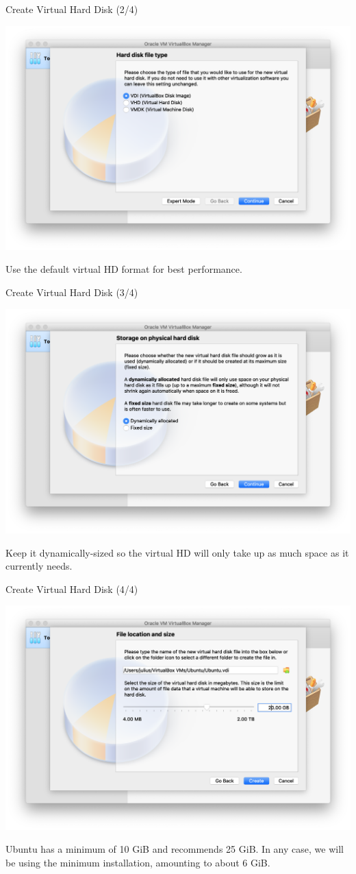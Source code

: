 \documentclass[11pt]{beamer}
\begin{document}
\begin{frame}{Create Virtual Hard Disk (2/4)}
  \begin{center}
    \includegraphics[width=0.8\linewidth]{vb-hd2}
  \end{center}
  Use the default virtual HD format for best performance.
\end{frame}

\begin{frame}{Create Virtual Hard Disk (3/4)}
  \begin{center}
    \includegraphics[width=0.8\linewidth]{vb-hd3}
  \end{center}
  Keep it dynamically-sized so the virtual HD will only take up as much space as it currently needs.
\end{frame}

\begin{frame}{Create Virtual Hard Disk (4/4)}
  \begin{center}
    \includegraphics[width=0.8\linewidth]{vb-hd4}
  \end{center}
  Ubuntu has a minimum of 10 GiB and recommends 25 GiB. In any case, we will be using the minimum installation, amounting to about 6 GiB.
\end{frame}
\end{document}
